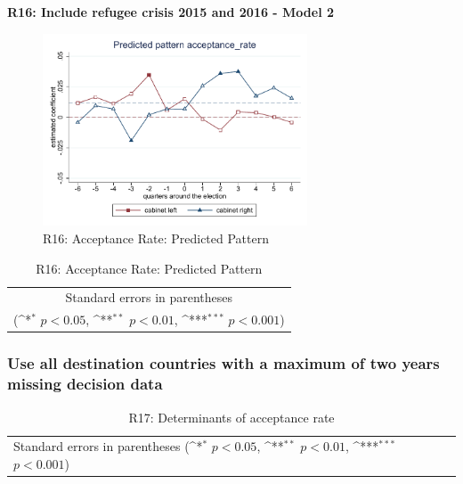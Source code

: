 \documentclass[10pt,a4paper]{scrartcl}
\begin{document}
\clearpage
\textbf{R16: Include refugee crisis 2015 and 2016 - Model 2}
\begin{figure}[!ht]
	\centering
	\includegraphics[width=0.7\textwidth]{figures_edited/acceptance_rate_graph2_R16.pdf}
	\caption{R16: Acceptance Rate: Predicted Pattern}
\end{figure}

\begin{table}[!ht]\centering
	\footnotesize
	\renewcommand{\arraystretch}{1.2}
	\def\sym#1{\ifmmode^{#1}\else\(^{#1}\)\fi}
	\caption{R16: Acceptance Rate: Predicted Pattern}
	\begin{tabular}{l*{2}{c}}
		\hline\hline
		
		\hline\hline
		\multicolumn{3}{c}{\footnotesize Standard errors in parentheses} \\
		\multicolumn{3}{c}{\footnotesize (\sym{*} \(p<0.05\), \sym{**} \(p<0.01\), \sym{***} \(p<0.001\))} \\
	\end{tabular}
\end{table}






\clearpage
\FloatBarrier
\subsubsection{Use all destination countries with a maximum of two years missing decision data}
\begin{table}[!ht]\centering
	\renewcommand{\arraystretch}{1.25}
	\small
	\def\sym#1{\ifmmode^{#1}\else\(^{#1}\)\fi}
	\caption{R17: Determinants of acceptance rate}
	\begin{tabular}{l*{3}{c}}
		\hline\hline
		
		\hline\hline
		\multicolumn{4}{l}{\footnotesize Standard errors in parentheses (\sym{*} \(p<0.05\), \sym{**} \(p<0.01\), \sym{***} \(p<0.001\))}\\
	\end{tabular}
\end{table}
\end{document}
